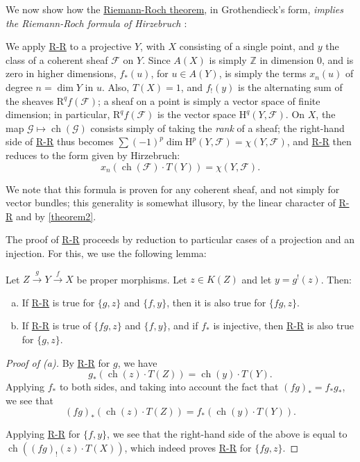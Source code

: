\documentclass{article}
\theoremstyle{plain}
\newenvironment{lemma}[1]
    {\renewcommand\theinnercustomlemma{#1}\innercustomlemma}
    {\endinnercustomlemma}
\theoremstyle{definition}
\newcommand{\sh}{\mathscr}
\newcommand{\HH}{\mathrm{H}}
\newcommand{\RR}{\mathrm{R}}
\DeclareMathOperator{\ch}{ch}
\newcommand{\oldpage}[1]{\marginpar{\footnotesize$\Big\vert$ \textit{p.~#1}}}
\begin{document}
We now show how the \hyperref[theoremriemannroch]{Riemann-Roch theorem}, in Grothendieck's form, \emph{implies the Riemann-Roch formula of Hirzebruch \cite{9}}:

We apply \hyperref[theoremriemannroch]{R-R} to a projective $Y$, with $X$ consisting of a single point, and $y$ the class of a coherent sheaf $\sh{F}$ on $Y$.
Since $A(X)$ is simply $\mathbb{Z}$ in dimension $0$, and is zero in higher dimensions, $f_*(u)$, for $u\in A(Y)$, is simply the terms $x_n(u)$ of degree $n=\dim Y$ in $u$.
Also, $T(X)=1$, and $f_!(y)$ is the alternating sum of the sheaves $\RR^qf(\sh{F})$;
a sheaf on a point is simply a vector space of finite dimension;
in particular, $\RR^qf(\sh{F})$ is the vector space $\HH^q(Y,\sh{F})$.
On $X$, the map $\sh{G}\mapsto\ch(\sh{G})$ consists simply of taking the \emph{rank} of a sheaf;
the right-hand side of \hyperref[theoremriemannroch]{R-R} thus becomes $\sum(-1)^p\dim\HH^p(Y,\sh{F}) = \chi(Y,\sh{F})$, and \hyperref[theoremriemannroch]{R-R} then reduces to the form given by Hirzebruch:
\[
  x_n(\ch(\sh{F})\cdot T(Y)) = \chi(Y,\sh{F}).
\]

We note that this formula is proven for any coherent sheaf, and not simply for vector bundles;
this generality is somewhat illusory, by the linear character of \hyperref[theoremriemannroch]{R-R} and by \cref{theorem2}.

The proof of \hyperref[theoremriemannroch]{R-R} proceeds by reduction to particular cases of a projection and an injection.
For this, we use the following lemma:

\begin{lemma}{15}
\label{lemma15}
  Let $Z\xrightarrow{g}Y\xrightarrow{f}X$ be proper morphisms.
  Let $z\in K(Z)$ and let $y=g^!(z)$. Then:
  \begin{enumerate}[(a)]
    \item If \hyperref[theoremriemannroch]{R-R} is true for $\{g,z\}$ and $\{f,y\}$, then it is also true for $\{fg,z\}$.
    \item If \hyperref[theoremriemannroch]{R-R} is true of $\{fg,z\}$ and $\{f,y\}$, and if $f_*$ is injective, then \hyperref[theoremriemannroch]{R-R} is also true for $\{g,z\}$.
  \end{enumerate}
\end{lemma}

\begin{proof}[Proof of (a)]
  By \hyperref[theoremriemannroch]{R-R} for $g$, we have
  \[
    g_*(\ch(z)\cdot T(Z)) = \ch(y)\cdot T(Y).
  \]
  \oldpage{114}
  Applying $f_*$ to both sides, and taking into account the fact that $(fg)_*=f_*g_*$, we see that
  \[
    (fg)_*(\ch(z)\cdot T(Z)) = f_*(\ch(y)\cdot T(Y)).
  \]

  Applying \hyperref[theoremriemannroch]{R-R} for $\{f,y\}$, we see that the right-hand side of the above is equal to $\ch((fg)_!(z)\cdot T(X))$, which indeed proves \hyperref[theoremriemannroch]{R-R} for $\{fg,z\}$.
\end{proof}
\end{document}
